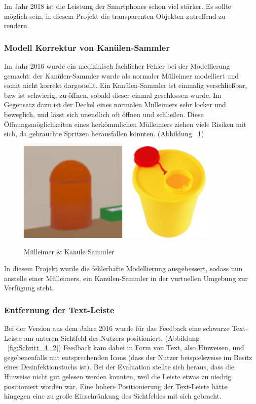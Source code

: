    Im Jahr 2018 ist die Leistung der Smartphones schon viel stärker. Es sollte möglich sein, in diesem Projekt die transparenten Objekten zutreffend zu rendern.
   
   \subsubsection{Modell Korrektur von Kanülen-Sammler}
   Im Jahr 2016 wurde ein medizinisch fachlicher Fehler bei der Modellierung gemacht: der Kanülen-Sammler wurde als normaler Mülleimer modelliert und somit nicht korrekt dargestellt. Ein Kanülen-Sammler ist einmalig verschließbar, bzw ist schwierig, zu öffnen, sobald dieser einmal geschlossen wurde. Im Gegensatz dazu ist der Deckel eines normalen Mülleimers sehr locker und beweglich, und lässt sich unendlich oft öffnen und schließen. Diese Öffnungsmöglichkeiten eines herkömmlichen Mülleimers ziehen viele Risiken mit sich, da gebrauchte Spritzen herausfallen könnten. (Abbildung ~\ref{fig:muelleimerKanueleSammler})

\begin{figure}[ht]
\vspace*{1em}
\centering
\caption{Mülleimer \& Kanüle Sammler}
\includegraphics[width=\textwidth]{images/muelleimerKanueleSammler.png}
\label{fig:muelleimerKanueleSammler} 
\end{figure}

In diesem Projekt wurde die fehlerhafte Modellierung ausgebessert, sodass nun anstelle einer Mülleimers, ein Kanülen-Sammler in der vurtuellen Umgebung zur Verfügung steht.

   \subsubsection{Entfernung der Text-Leiste}
   Bei der Version aus dem Jahre 2016 wurde für das Feedback eine schwarze Text-Leiste am unteren Sichtfeld des Nutzers positioniert. (Abbildung ~\ref{fig:Schritt_4_2}) Feedback kam dabei in Form von Text, also Hinweisen, und gegebenenfalls mit entsprechenden Icons (dass der Nutzer beispielsweise im Besitz eines Desinfektionstuchs ist). Bei der Evaluation stellte sich heraus, dass die Hinweise nicht gut gelesen werden konnten, weil die Leiste etwas zu niedrig positioniert worden war. Eine höhere Positionierung der Text-Leiste hätte hingegen eine zu große Einschränkung des Sichtfeldes mit sich gebracht.
   
